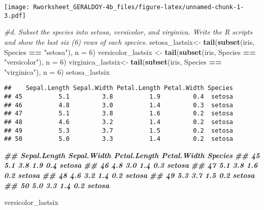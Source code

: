 \documentclass[
]{article}
\newenvironment{Shaded}{\begin{snugshade}}{\end{snugshade}}
\newcommand{\AttributeTok}[1]{\textcolor[rgb]{0.13,0.29,0.53}{#1}}
\newcommand{\CommentTok}[1]{\textcolor[rgb]{0.56,0.35,0.01}{\textit{#1}}}
\newcommand{\DecValTok}[1]{\textcolor[rgb]{0.00,0.00,0.81}{#1}}
\newcommand{\DocumentationTok}[1]{\textcolor[rgb]{0.56,0.35,0.01}{\textbf{\textit{#1}}}}
\newcommand{\FunctionTok}[1]{\textcolor[rgb]{0.13,0.29,0.53}{\textbf{#1}}}
\newcommand{\NormalTok}[1]{#1}
\newcommand{\OtherTok}[1]{\textcolor[rgb]{0.56,0.35,0.01}{#1}}
\newcommand{\SpecialCharTok}[1]{\textcolor[rgb]{0.81,0.36,0.00}{\textbf{#1}}}
\newcommand{\StringTok}[1]{\textcolor[rgb]{0.31,0.60,0.02}{#1}}
\begin{document}
\texttt{[image: Rworksheet\_GERALDOY-4b\_files/figure-latex/unnamed-chunk-1-3.pdf]}

\begin{Shaded}
\begin{Highlighting}[]
\CommentTok{\#d. Subset the species into setosa, versicolor, and virginica. Write the R scripts and show the last six (6) rows of each species.}
\NormalTok{setosa\_lastsix}\OtherTok{\textless{}{-}} \FunctionTok{tail}\NormalTok{(}\FunctionTok{subset}\NormalTok{(iris, Species }\SpecialCharTok{==} \StringTok{"setosa"}\NormalTok{), }\AttributeTok{n =} \DecValTok{6}\NormalTok{)}
\NormalTok{versicolor\_lastsix }\OtherTok{\textless{}{-}} \FunctionTok{tail}\NormalTok{(}\FunctionTok{subset}\NormalTok{(iris, Species }\SpecialCharTok{==} \StringTok{"versicolor"}\NormalTok{), }\AttributeTok{n =} \DecValTok{6}\NormalTok{)}
\NormalTok{virginica\_lastsix}\OtherTok{\textless{}{-}} \FunctionTok{tail}\NormalTok{(}\FunctionTok{subset}\NormalTok{(iris, Species }\SpecialCharTok{==} \StringTok{"virginica"}\NormalTok{), }\AttributeTok{n =} \DecValTok{6}\NormalTok{)}
\NormalTok{setosa\_lastsix}
\end{Highlighting}
\end{Shaded}

\begin{verbatim}
##    Sepal.Length Sepal.Width Petal.Length Petal.Width Species
## 45          5.1         3.8          1.9         0.4  setosa
## 46          4.8         3.0          1.4         0.3  setosa
## 47          5.1         3.8          1.6         0.2  setosa
## 48          4.6         3.2          1.4         0.2  setosa
## 49          5.3         3.7          1.5         0.2  setosa
## 50          5.0         3.3          1.4         0.2  setosa
\end{verbatim}

\begin{Shaded}
\begin{Highlighting}[]
\DocumentationTok{\#\# Sepal.Length Sepal.Width Petal.Length Petal.Width Species}
\DocumentationTok{\#\# 45 5.1 3.8 1.9 0.4 setosa}
\DocumentationTok{\#\# 46 4.8 3.0 1.4 0.3 setosa}
\DocumentationTok{\#\# 47 5.1 3.8 1.6 0.2 setosa}
\DocumentationTok{\#\# 48 4.6 3.2 1.4 0.2 setosa}
\DocumentationTok{\#\# 49 5.3 3.7 1.5 0.2 setosa}
\DocumentationTok{\#\# 50 5.0 3.3 1.4 0.2 setosa}


\NormalTok{versicolor\_lastsix}
\end{Highlighting}
\end{Shaded}
\end{document}
